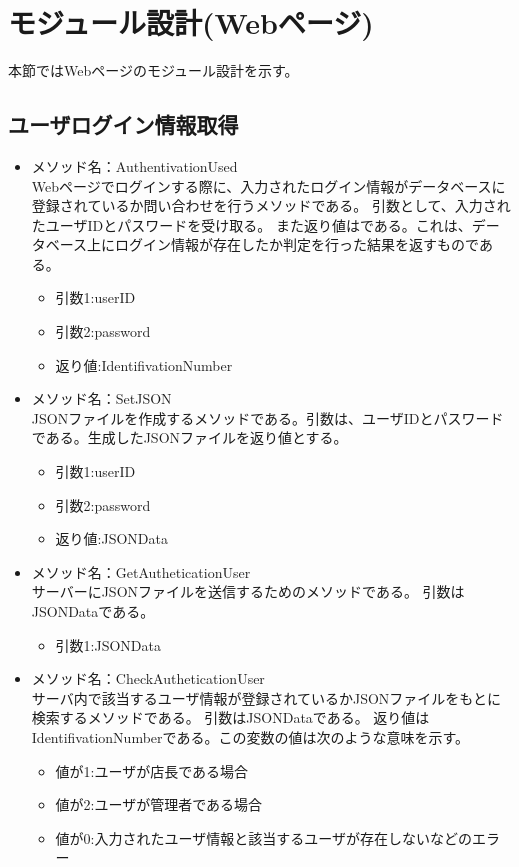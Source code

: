 \documentclass[a4j]{jarticle}
\begin{document}
\section{モジュール設計(Webページ)}

本節ではWebページのモジュール設計を示す。
\subsection{ユーザログイン情報取得}
\begin{itemize}
\item メソッド名：AuthentivationUsed\\
Webページでログインする際に、入力されたログイン情報がデータベースに登録されているか問い合わせを行うメソッドである。
引数として、入力されたユーザIDとパスワードを受け取る。
また返り値はである。これは、データベース上にログイン情報が存在したか判定を行った結果を返すものである。

	\begin{itemize}
		\item 引数1:userID
		\item 引数2:password
		\item 返り値:IdentifivationNumber
	\end{itemize}
\item メソッド名：SetJSON\\

JSONファイルを作成するメソッドである。引数は、ユーザIDとパスワードである。生成したJSONファイルを返り値とする。
	\begin{itemize}
		\item 引数1:userID
		\item 引数2:password
		\item 返り値:JSONData
	\end{itemize}
\item メソッド名：GetAutheticationUser\\

サーバーにJSONファイルを送信するためのメソッドである。
引数はJSONDataである。
	\begin{itemize}
		\item 引数1:JSONData
	\end{itemize}
	
\item メソッド名：CheckAutheticationUser\\

サーバ内で該当するユーザ情報が登録されているかJSONファイルをもとに検索するメソッドである。
引数はJSONDataである。
返り値はIdentifivationNumberである。この変数の値は次のような意味を示す。
	\begin{itemize}
		\item 値が1:ユーザが店長である場合
		\item 値が2:ユーザが管理者である場合
		\item 値が0:入力されたユーザ情報と該当するユーザが存在しないなどのエラー
	\end{itemize}



\end{itemize}
\end{document}
